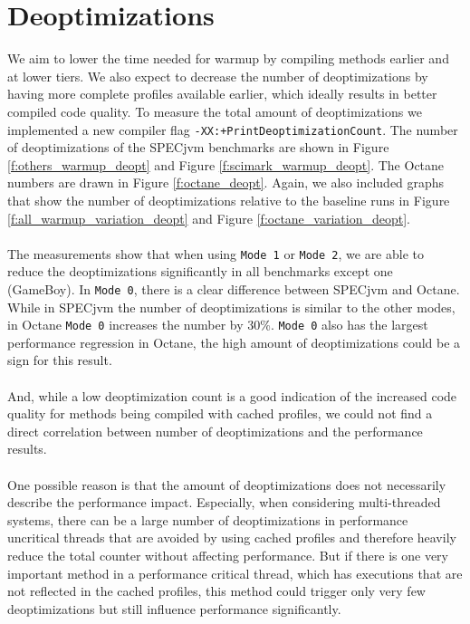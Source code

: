 \section{Deoptimizations}
\label{s:perf_deoptimizations}
We aim to lower the time needed for warmup by compiling methods earlier and at lower tiers. We also expect to decrease the number of deoptimizations by having more complete profiles available earlier, which ideally results in better compiled code quality. To measure the total amount of deoptimizations we implemented a new compiler flag \texttt{-XX:+PrintDeoptimizationCount}.
The number of deoptimizations of the SPECjvm benchmarks are shown in Figure \ref{f:others_warmup_deopt} and Figure \ref{f:scimark_warmup_deopt}. The Octane numbers are drawn in Figure \ref{f:octane_deopt}.
Again, we also included graphs that show the number of deoptimizations relative to the baseline runs in Figure \ref{f:all_warmup_variation_deopt} and Figure \ref{f:octane_variation_deopt}.
\\\\
The measurements show that when using \texttt{Mode 1} or \texttt{Mode 2}, we are able to reduce the deoptimizations significantly in all benchmarks except one (GameBoy). In \texttt{Mode 0}, there is a clear difference between SPECjvm and Octane. While in SPECjvm the number of deoptimizations is similar to the other modes, in Octane \texttt{Mode 0} increases the number by 30\%. \texttt{Mode 0} also has the largest performance regression in Octane, the high amount of deoptimizations could be a sign for this result. 
\\\\
And, while a low deoptimization count is a good indication of the increased code quality for methods being compiled with cached profiles, we could not find a direct correlation between number of deoptimizations and the performance results.
\\\\
One possible reason is that the amount of deoptimizations does not necessarily describe the performance impact. Especially, when considering multi-threaded systems, there can be a large number of deoptimizations in performance uncritical threads that are avoided by using cached profiles and therefore heavily reduce the total counter without affecting performance. But if there is one very important method in a performance critical thread, which has executions that are not reflected in the cached profiles, this method could trigger only very few deoptimizations but still influence performance significantly.
